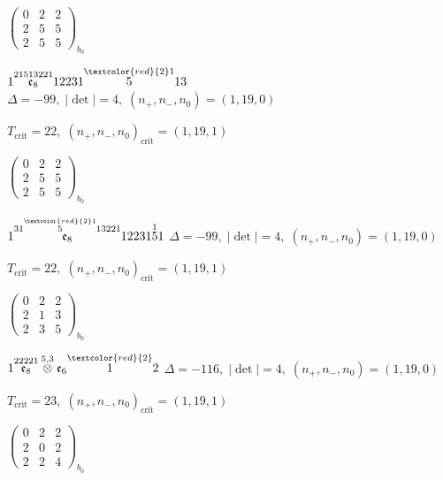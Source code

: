 \documentclass[10pt]{article}
\begin{document}
\hspace{2em}$\left(\begin{smallmatrix}0 & 2 & 2 \\ 2 & 5 & 5 \\ 2 & 5 & 5\end{smallmatrix}\right)_{\!b_0}$

\smallskip

$1\overset{21513221}{\mathfrak{e}_8}12231\overset{\textcolor{red}{2}1}{5}13$ \quad $\Delta=-99,\; |\det|=4,\; (n_+,n_-,n_0)=(1,19,0)$

\hspace{1em}$T_{\text{crit}}=22,\; (n_+,n_-,n_0)_{\text{crit}}=(1,19,1)$

\hspace{2em}$\left(\begin{smallmatrix}0 & 2 & 2 \\ 2 & 5 & 5 \\ 2 & 5 & 5\end{smallmatrix}\right)_{\!b_0}$

\smallskip

$1\overset{31\overset{\textcolor{red}{2}1}{5}13221}{\mathfrak{e}_8}12231\overset{1}{5}1$ \quad $\Delta=-99,\; |\det|=4,\; (n_+,n_-,n_0)=(1,19,0)$

\hspace{1em}$T_{\text{crit}}=22,\; (n_+,n_-,n_0)_{\text{crit}}=(1,19,1)$

\hspace{2em}$\left(\begin{smallmatrix}0 & 2 & 2 \\ 2 & 1 & 3 \\ 2 & 3 & 5\end{smallmatrix}\right)_{\!b_0}$

\smallskip

$1\overset{22221}{\mathfrak{e}_8}\overset{5,3}{\otimes}\mathfrak{e}_6\overset{\textcolor{red}{2}}{1}2$ \quad $\Delta=-116,\; |\det|=4,\; (n_+,n_-,n_0)=(1,19,0)$

\hspace{1em}$T_{\text{crit}}=23,\; (n_+,n_-,n_0)_{\text{crit}}=(1,19,1)$

\hspace{2em}$\left(\begin{smallmatrix}0 & 2 & 2 \\ 2 & 0 & 2 \\ 2 & 2 & 4\end{smallmatrix}\right)_{\!b_0}$
\end{document}
